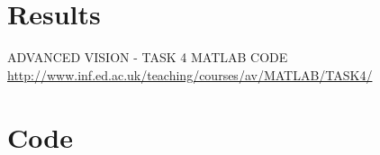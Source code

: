 \documentclass{article}
\begin{document}
\section{Results}


\begin{thebibliography}{9}
  
  ADVANCED VISION - TASK 4 MATLAB CODE
  \url{http://www.inf.ed.ac.uk/teaching/courses/av/MATLAB/TASK4/} 
  
\end{thebibliography}

\appendix


\newpage

\newpage
\section{Code}
\label{apen:code_in}

%
\end{document}
